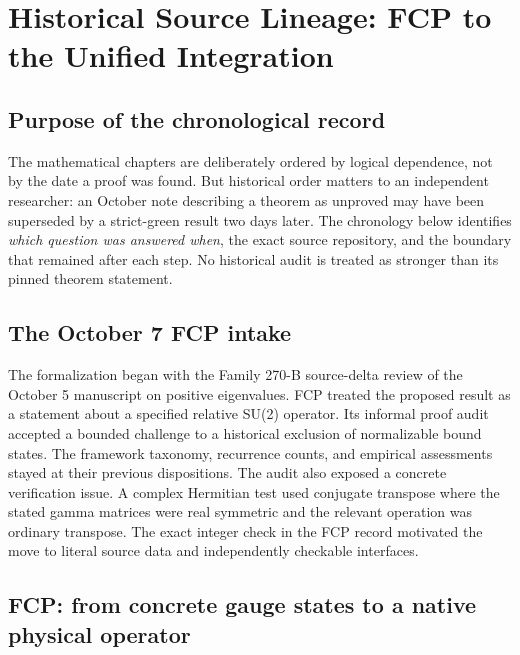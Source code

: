 \chapter[Historical Source Lineage]{Historical Source Lineage: FCP to the Unified Integration}
\label{app:lineage}

\section{Purpose of the chronological record}
The mathematical chapters are deliberately ordered by logical dependence,
not by the date a proof was found. But historical order matters to an
independent researcher: an October note describing a theorem as unproved
may have been superseded by a strict-green result two days later. The
chronology below identifies \emph{which question was answered when}, the
exact source repository, and the boundary that remained after each step.
No historical audit is treated as stronger than its pinned theorem statement.

\section{The October 7 FCP intake}
The formalization began with the Family 270-B source-delta review of
the October 5 manuscript on positive eigenvalues. FCP treated the
proposed result as a statement about a specified relative SU(2)
operator. Its informal proof audit accepted a bounded challenge to
a historical exclusion of normalizable bound states. The framework
taxonomy, recurrence counts, and empirical assessments stayed at
their previous dispositions. The audit also exposed a concrete
verification issue. A complex Hermitian test used conjugate
transpose where the stated gamma matrices were real symmetric and
the relevant operation was ordinary transpose. The exact integer
check in the FCP record motivated the move to literal source data
and independently checkable interfaces.

\section{FCP: from concrete gauge states to a native physical operator}

